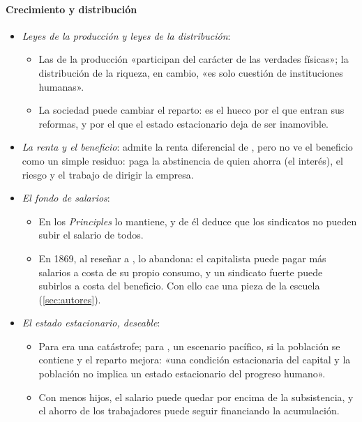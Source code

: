 \documentclass[11pt]{article}
\begin{document}
\paragraph{Crecimiento y distribución}\label{sec:mill-distribucion}
\begin{itemize}
\item \emph{Leyes de la producción y leyes de la distribución}:
  \begin{itemize}
  \item Las de la producción «participan del carácter de las verdades físicas»; la distribución de la riqueza, en cambio, «es solo cuestión de instituciones humanas»\nocite{Mill1909Principles}.
  \item La sociedad puede cambiar el reparto: es el hueco por el que entran sus reformas, y por el que el estado estacionario deja de ser inamovible.
  \end{itemize}
\item \emph{La renta y el beneficio}: admite la renta diferencial de , pero no ve el beneficio como un simple residuo: paga la abstinencia de quien ahorra (el interés), el riesgo y el trabajo de dirigir la empresa.
\item \emph{El fondo de salarios}:
  \begin{itemize}
  \item En los \emph{Principles} lo mantiene, y de él deduce que los sindicatos no pueden subir el salario de todos.
  \item En 1869, al reseñar a , lo abandona: el capitalista puede pagar más salarios a costa de su propio consumo, y un sindicato fuerte puede subirlos a costa del beneficio\nocite{Mill1869Thornton}. Con ello cae una pieza de la escuela (\ref{sec:autores}).
  \end{itemize}
\item \emph{El estado estacionario, deseable}:
  \begin{itemize}
  \item Para  era una catástrofe; para , un escenario pacífico, si la población se contiene y el reparto mejora: «una condición estacionaria del capital y la población no implica un estado estacionario del progreso humano»\nocite{Mill1909Principles}.
  \item Con menos hijos, el salario puede quedar por encima de la subsistencia, y el ahorro de los trabajadores puede seguir financiando la acumulación.
  \end{itemize}
\end{itemize}
\end{document}
